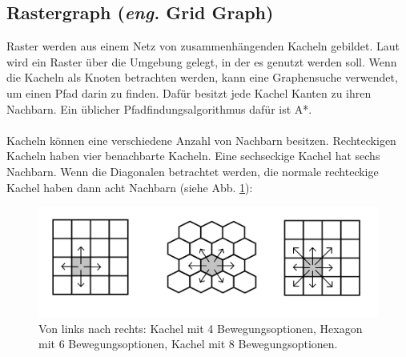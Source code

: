 \subsection{Rastergraph (\textit{eng.} Grid Graph)}
Raster werden aus einem Netz von zusammenhängenden Kacheln gebildet. Laut \cite{Grid:02} wird ein Raster über die Umgebung gelegt, in der es genutzt werden soll. Wenn die Kacheln als Knoten betrachten werden, kann eine Graphensuche verwendet, um einen Pfad darin zu finden. Dafür besitzt jede Kachel Kanten zu ihren Nachbarn. Ein üblicher Pfadfindungsalgorithmus dafür ist A*.
\\\\
Kacheln können eine verschiedene Anzahl von Nachbarn besitzen. Rechteckigen Kacheln haben vier benachbarte Kacheln. Eine sechseckige Kachel hat sechs Nachbarn. Wenn die Diagonalen betrachtet werden, die normale rechteckige Kachel haben dann acht Nachbarn (siehe Abb. \ref{sec2a}):
\begin{figure} %
	\centering
	\includegraphics[width=\textwidth]{images/Grid_Tiles.png}
	\caption{Von links nach rechts: Kachel mit 4 Bewegungsoptionen, Hexagon mit 6 Bewegungsoptionen, Kachel mit 8 Bewegungsoptionen.}
	\label{sec2a}
\end{figure}


